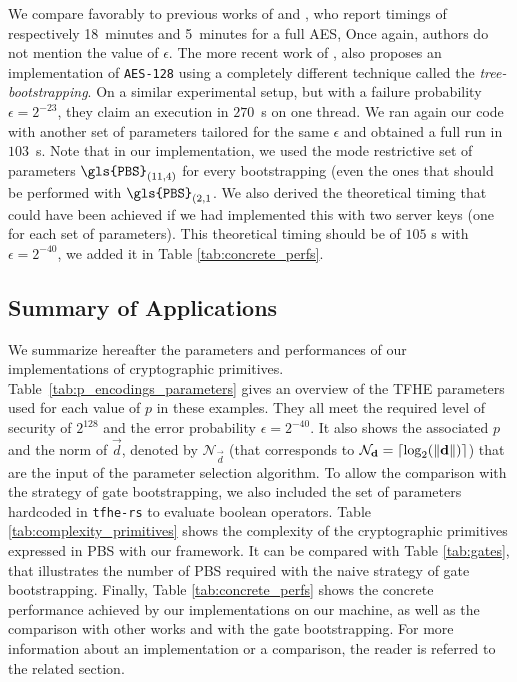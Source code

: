We compare favorably to previous works of \cite{C:GenHalSma12} and \cite{PKC:CorLepTib14}, who report timings of respectively 18~minutes and 5~minutes for a full \gls{AES}, Once again, authors do not mention the value of $\epsilon$. The more recent work of \cite{DBLP:conf/wahc/TramaCBS23}, also proposes an implementation of \texttt{\gls{AES}-128} using a completely different technique called the \emph{tree-bootstrapping}. On a similar experimental setup, but with a failure probability $\epsilon=2^{-23}$, they claim an execution in $270$~s on one thread. We ran again our code with another set of parameters tailored for the same $\epsilon$ and obtained a full run in $103$~s.  Note that in our implementation, we used the mode restrictive set of parameters $\texttt{\gls{PBS}}_{(11, 4)}$ for every bootstrapping (even the ones that should be performed with $\texttt{\gls{PBS}}_{(2, 1}$. We also derived the theoretical timing that could have been achieved if we had implemented this with two server keys (one for each set of parameters). This theoretical timing should be of $105$ s with $\epsilon=2^{-40}$, we added it in Table \ref{tab:concrete_perfs}.


\subsection{Summary of Applications}
\label{sec:tables_perfs}


We summarize hereafter the parameters and performances of our implementations of cryptographic primitives. Table~\ref{tab:p_encodings_parameters} gives an overview of the \gls{TFHE} parameters used for each value of $p$ in these examples. They all meet the required level of security of $2^{128}$ and the error probability $\epsilon=2^{-40}$. It also shows the associated $p$ and the norm of $\vec d$, denoted by $\mathcal{N}_{\vec d}$ (that corresponds to $\mathcal{N}_{\mathbf d} = \lceil \log_2(\lVert \mathbf d \rVert) \rceil$) that are the input of the parameter selection algorithm. To allow the comparison with the strategy of gate bootstrapping, we also included the set of parameters hardcoded in \texttt{tfhe-rs} to evaluate boolean operators. Table \ref{tab:complexity_primitives} shows the complexity of the cryptographic primitives expressed in \gls{PBS} with our framework. It can be compared with Table \ref{tab:gates}, that illustrates the number of \gls{PBS} required with the naive strategy of gate bootstrapping. Finally, Table \ref{tab:concrete_perfs} shows the concrete performance achieved by our implementations on our machine, as well as the comparison with other works and with the gate bootstrapping. For more information about an implementation or a comparison, the reader is referred to the related section.


